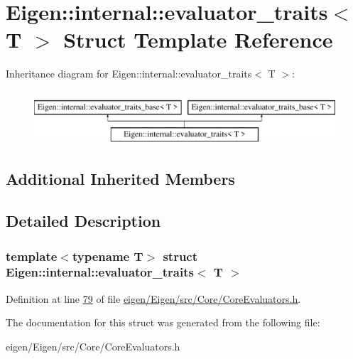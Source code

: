 \hypertarget{struct_eigen_1_1internal_1_1evaluator__traits}{}\section{Eigen\+:\+:internal\+:\+:evaluator\+\_\+traits$<$ T $>$ Struct Template Reference}
\label{struct_eigen_1_1internal_1_1evaluator__traits}
Inheritance diagram for Eigen\+:\+:internal\+:\+:evaluator\+\_\+traits$<$ T $>$\+:\begin{figure}[H]
\begin{center}
\leavevmode
\includegraphics[height=2.000000cm]{struct_eigen_1_1internal_1_1evaluator__traits}
\end{center}
\end{figure}
\subsection*{Additional Inherited Members}


\subsection{Detailed Description}
\subsubsection*{template$<$typename T$>$\newline
struct Eigen\+::internal\+::evaluator\+\_\+traits$<$ T $>$}



Definition at line \hyperlink{eigen_2_eigen_2src_2_core_2_core_evaluators_8h_source_l00079}{79} of file \hyperlink{eigen_2_eigen_2src_2_core_2_core_evaluators_8h_source}{eigen/\+Eigen/src/\+Core/\+Core\+Evaluators.\+h}.



The documentation for this struct was generated from the following file\+:\begin{DoxyCompactItemize}
\item 
eigen/\+Eigen/src/\+Core/\+Core\+Evaluators.\+h\end{DoxyCompactItemize}
